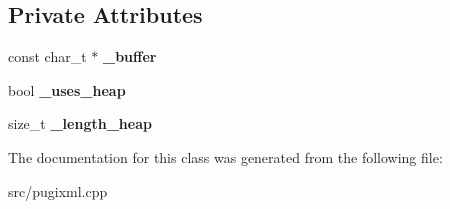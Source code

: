 \subsection*{Private Attributes}
\begin{DoxyCompactItemize}
\item 
\mbox{\label{classxpath__string_ad52a80412797ca64bbd1bff527e9d666}} 
const char\+\_\+t $\ast$ {\bfseries \+\_\+buffer}
\item 
\mbox{\label{classxpath__string_a67a86f6d1a9cf20b922fc9fb1268d4c1}} 
bool {\bfseries \+\_\+uses\+\_\+heap}
\item 
\mbox{\label{classxpath__string_a2379f48ff9c9dd28e00f0db3fc76c9a9}} 
size\+\_\+t {\bfseries \+\_\+length\+\_\+heap}
\end{DoxyCompactItemize}


The documentation for this class was generated from the following file\+:\begin{DoxyCompactItemize}
\item 
src/pugixml.\+cpp\end{DoxyCompactItemize}
